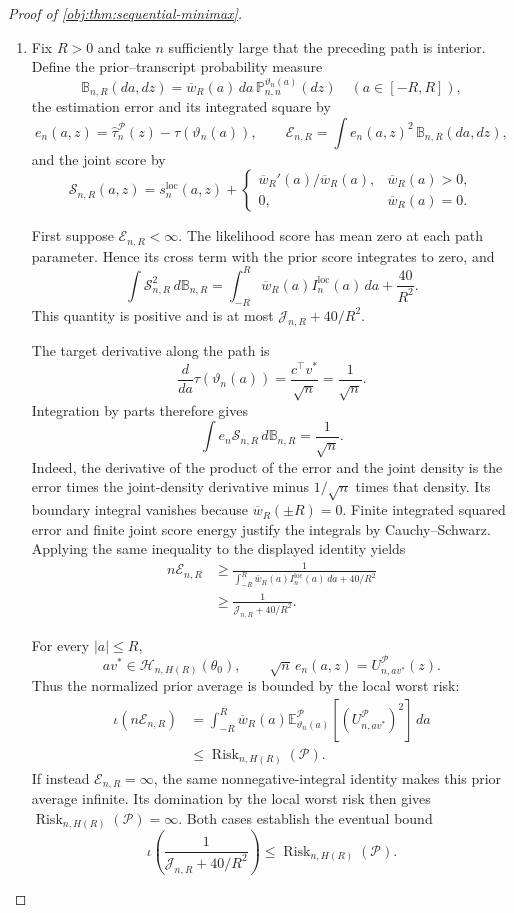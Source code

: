 \begin{proof}[Proof of \cref{obj:thm:sequential-minimax}]
\begin{enumerate}
\item
Fix \(R>0\) and take \(n\) sufficiently large that the preceding path is interior. Define the prior--transcript probability measure
\[
\mathbb B_{n,R}(da,dz)
=
\overline w_R(a)\,da\,
\mathbb P_{n,n}^{\vartheta_n(a)}(dz)
\quad(a\in[-R,R]),
\]
the estimation error and its integrated square by
\[
e_n(a,z)=\widehat\tau_n^{\mathcal P}(z)-\tau(\vartheta_n(a)),
\qquad
\mathcal E_{n,R}=\int e_n(a,z)^2\,\mathbb B_{n,R}(da,dz),
\]
and the joint score by
\[
\mathscr S_{n,R}(a,z)
=
s_n^{\mathrm{loc}}(a,z)
+
\begin{cases}
\overline w_R'(a)/\overline w_R(a),&\overline w_R(a)>0,\\
0,&\overline w_R(a)=0.
\end{cases}
\]

First suppose \(\mathcal E_{n,R}<\infty\). The likelihood score has mean zero at each path parameter. Hence its cross term with the prior score integrates to zero, and
\[
\int\mathscr S_{n,R}^2\,d\mathbb B_{n,R}
=
\int_{-R}^{R}\overline w_R(a)I_n^{\mathrm{loc}}(a)\,da
+
\frac{40}{R^2}.
\]
This quantity is positive and is at most \(\mathcal J_{n,R}+40/R^2\).

The target derivative along the path is
\[
\frac{d}{da}\tau(\vartheta_n(a))
=
\frac{c^\top v^*}{\sqrt n}
=
\frac1{\sqrt n}.
\]
Integration by parts therefore gives
\[
\int e_n\mathscr S_{n,R}\,d\mathbb B_{n,R}
=
\frac1{\sqrt n}.
\]
Indeed, the derivative of the product of the error and the joint density is the error times the joint-density derivative minus \(1/\sqrt n\) times that density. Its boundary integral vanishes because \(\overline w_R(\pm R)=0\). Finite integrated squared error and finite joint score energy justify the integrals by Cauchy--Schwarz. Applying the same inequality to the displayed identity yields
\[
\begin{aligned}
n\mathcal E_{n,R}
&\ge
\frac{1}{
\displaystyle
\int_{-R}^{R}\overline w_R(a)I_n^{\mathrm{loc}}(a)\,da
+40/R^2}\\
&\ge
\frac1{\mathcal J_{n,R}+40/R^2}.
\end{aligned}
\]

For every \(|a|\le R\),
\[
av^*\in\mathcal H_{n,H(R)}(\theta_0),
\qquad
\sqrt n\,e_n(a,z)=U_{n,av^*}^{\mathcal P}(z).
\]
Thus the normalized prior average is bounded by the local worst risk:
\[
\begin{aligned}
\iota(n\mathcal E_{n,R})
&=
\int_{-R}^{R}\overline w_R(a)
\mathbb E_{\vartheta_n(a)}^{\mathcal P}
\!\left[(U_{n,av^*}^{\mathcal P})^2\right]\,da\\
&\le \operatorname{Risk}_{n,H(R)}(\mathcal P).
\end{aligned}
\]
If instead \(\mathcal E_{n,R}=\infty\), the same nonnegative-integral identity makes this prior average infinite. Its domination by the local worst risk then gives
\(\operatorname{Risk}_{n,H(R)}(\mathcal P)=\infty\).
Both cases establish the eventual bound
\[
\iota\!\left(\frac1{\mathcal J_{n,R}+40/R^2}\right)
\le
\operatorname{Risk}_{n,H(R)}(\mathcal P).
\]


\end{enumerate}
\end{proof}
